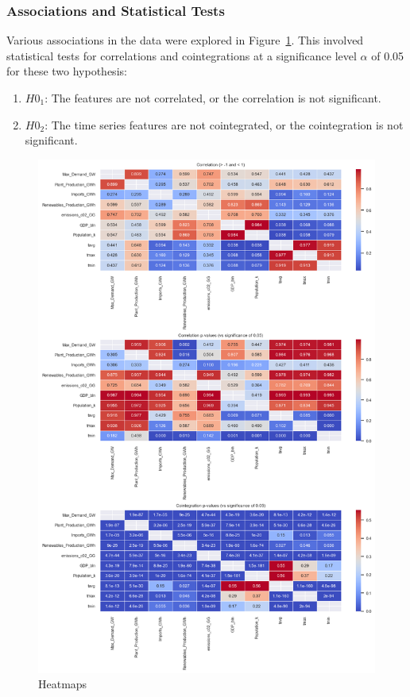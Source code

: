 \documentclass{ieeeaccess}
\begin{document}
\subsubsection{Associations and Statistical Tests}
Various associations in the data were explored in Figure~\ref{fig:corr_coint_heatmaps}. This involved statistical tests for correlations and cointegrations at a significance level \(\alpha\) of 0.05 for these two hypothesis:
\begin{enumerate}
    \item \(H0_1\): The features are not correlated, or the correlation is not significant.
    \item \(H0_2\): The time series features are not cointegrated, or the cointegration is not significant.
\end{enumerate}
\begin{figure}[htb]
    \centering
    \includegraphics[width=\columnwidth]{data_analysis/corr_coint_heatmap.png}
    \caption{Heatmaps}
    \label{fig:corr_coint_heatmaps}
\end{figure}
\end{document}
